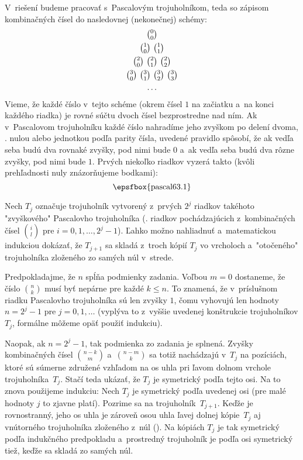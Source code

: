 {%
V~riešení budeme pracovať s~Pascalovým trojuholníkom, teda so zápisom kombinačných čísel do nasledovnej (nekonečnej) schémy:
$$
\gathered
\tbinom00\\
\tbinom10\ \tbinom11\\
\tbinom20\ \tbinom21\ \tbinom22\\
\tbinom30\ \tbinom31\ \tbinom32\ \tbinom33\\
\dots
\endgathered
$$
Vieme, že každé číslo v~tejto schéme (okrem čísel $1$ na začiatku a~na konci každého riadka) je rovné súčtu dvoch čísel bezprostredne nad ním. Ak v~Pascalovom trojuholníku každé číslo nahradíme jeho zvyškom po delení dvoma, \tj. nulou alebo jednotkou podľa parity čísla, uvedené pravidlo spôsobí, že ak vedľa seba budú dva rovnaké zvyšky, pod nimi bude $0$ a~ak vedľa seba budú dva rôzne zvyšky, pod nimi bude $1$. Prvých niekoľko riadkov vyzerá takto (kvôli prehľadnosti nuly znázorňujeme bodkami):
$$
\hbox{\epsfbox{pascal63.1}}
$$

Nech $T_{j}$ označuje trojuholník vytvorený z~prvých $2^j$ riadkov takéhoto "zvyškového" Pascalovho trojuholníka (\tj. riadkov pochádzajúcich z~kombinačných čísel $\binom il$ pre $i=0,1,\dots,2^j-1$).
Ľahko možno nahliadnuť a~matematickou indukciou dokázať, že $T_{j+1}$ sa skladá z~troch kópií $T_{j}$ vo vrcholoch a~"otočeného" trojuholníka zloženého zo samých núl v~strede.

Predpokladajme, že $n$ spĺňa podmienky zadania.
Voľbou $m=0$ dostaneme, že číslo $\binom{n}{k}$ musí byť nepárne pre každé $k\le n$. To znamená, že v~príslušnom riadku Pascalovho trojuholníka sú len zvyšky $1$, čomu vyhovujú len hodnoty $n=2^j-1$ pre $j=0,1,\dots$ (vyplýva to z~vyššie uvedenej konštrukcie trojuholníkov $T_j$, formálne môžeme opäť použiť indukciu).
%

Naopak, ak $n=2^j-1$, tak podmienka zo zadania je splnená. Zvyšky kombinačných čísel $\binom{n-k}{m}$ a~$\binom{n-m}{k}$ sa totiž nachádzajú v~$T_j$ na pozíciách, ktoré sú súmerne združené vzhľadom na os uhla pri ľavom dolnom vrchole trojuholníka~$T_j$. Stačí teda ukázať, že $T_{j}$ je symetrický podľa tejto osi. Na to znova použijeme indukciu: Nech $T_{j}$ je symetrický podľa uvedenej osi (pre malé hodnoty $j$ to zjavne platí).
Pozrime sa na trojuholník~$T_{j+1}$. Keďže je rovnostranný, jeho os uhla je zároveň osou uhla ľavej dolnej kópie~$T_{j}$ aj vnútorného trojuholníka zloženého z~núl (\obr).
Na kópiách $T_{j}$ je tak symetrický podľa indukčného predpokladu a~prostredný trojuholník je podľa osi symetrický tiež, keďže sa skladá zo samých núl.}

